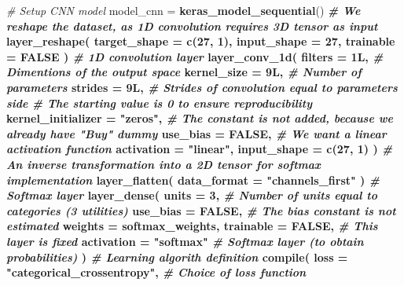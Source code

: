 \documentclass[12pt,]{article}
\newenvironment{Shaded}{\begin{snugshade}}{\end{snugshade}}
\newcommand{\CommentTok}[1]{\textcolor[rgb]{0.56,0.35,0.01}{\textit{#1}}}
\newcommand{\DataTypeTok}[1]{\textcolor[rgb]{0.13,0.29,0.53}{#1}}
\newcommand{\DecValTok}[1]{\textcolor[rgb]{0.00,0.00,0.81}{#1}}
\newcommand{\KeywordTok}[1]{\textcolor[rgb]{0.13,0.29,0.53}{\textbf{#1}}}
\newcommand{\NormalTok}[1]{#1}
\newcommand{\OperatorTok}[1]{\textcolor[rgb]{0.81,0.36,0.00}{\textbf{#1}}}
\newcommand{\OtherTok}[1]{\textcolor[rgb]{0.56,0.35,0.01}{#1}}
\newcommand{\StringTok}[1]{\textcolor[rgb]{0.31,0.60,0.02}{#1}}
\begin{document}
\begin{Shaded}
\begin{Highlighting}[]
\CommentTok{# Setup CNN model}
\NormalTok{model_cnn =}\StringTok{ }\KeywordTok{keras_model_sequential}\NormalTok{() }\OperatorTok{%
\StringTok{    }\CommentTok{# We reshape the dataset, as 1D convolution requires 3D tensor as input}
\StringTok{    }\KeywordTok{layer_reshape}\NormalTok{(}
        \DataTypeTok{target_shape =} \KeywordTok{c}\NormalTok{(}\DecValTok{27}\NormalTok{, }\DecValTok{1}\NormalTok{),}
        \DataTypeTok{input_shape =} \DecValTok{27}\NormalTok{,}
        \DataTypeTok{trainable =} \OtherTok{FALSE}
\NormalTok{    ) }\OperatorTok{%
\StringTok{    }\CommentTok{# 1D convolution layer}
\StringTok{    }\KeywordTok{layer_conv_1d}\NormalTok{(}
        \DataTypeTok{filters =}\NormalTok{ 1L, }\CommentTok{# Dimentions of the output space}
        \DataTypeTok{kernel_size =}\NormalTok{ 9L, }\CommentTok{# Number of parameters}
        \DataTypeTok{strides =}\NormalTok{ 9L, }\CommentTok{# Strides of convolution equal to parameters side}
        \CommentTok{# The starting value is 0 to ensure reproducibility}
        \DataTypeTok{kernel_initializer =} \StringTok{"zeros"}\NormalTok{, }
        \CommentTok{# The constant is not added, because we already have "Buy" dummy}
        \DataTypeTok{use_bias =} \OtherTok{FALSE}\NormalTok{, }
        \CommentTok{# We want a linear activation function }
        \DataTypeTok{activation =} \StringTok{"linear"}\NormalTok{, }
        \DataTypeTok{input_shape =} \KeywordTok{c}\NormalTok{(}\DecValTok{27}\NormalTok{, }\DecValTok{1}\NormalTok{)}
\NormalTok{    ) }\OperatorTok{%
\StringTok{    }\CommentTok{# An inverse transformation into a 2D tensor for softmax implementation}
\StringTok{    }\KeywordTok{layer_flatten}\NormalTok{(}
        \DataTypeTok{data_format =} \StringTok{"channels_first"}
\NormalTok{    ) }\OperatorTok{%
\StringTok{    }\CommentTok{# Softmax layer}
\StringTok{    }\KeywordTok{layer_dense}\NormalTok{(}
        \DataTypeTok{units =} \DecValTok{3}\NormalTok{, }\CommentTok{# Number of units equal to categories (3 utilities)}
        \DataTypeTok{use_bias =} \OtherTok{FALSE}\NormalTok{, }\CommentTok{# The bias constant is not estimated}
        \DataTypeTok{weights =}\NormalTok{ softmax_weights,}
        \DataTypeTok{trainable =} \OtherTok{FALSE}\NormalTok{, }\CommentTok{# This layer is fixed}
        \DataTypeTok{activation =} \StringTok{"softmax"} \CommentTok{# Softmax layer (to obtain probabilities)}
\NormalTok{    ) }\OperatorTok{%
\StringTok{    }\CommentTok{# Learning algorith definition}
\StringTok{    }\KeywordTok{compile}\NormalTok{(}
        \DataTypeTok{loss =} \StringTok{"categorical_crossentropy"}\NormalTok{, }\CommentTok{# Choice of loss function}
}}}}}
\end{Highlighting}
\end{Shaded}
\end{document}
